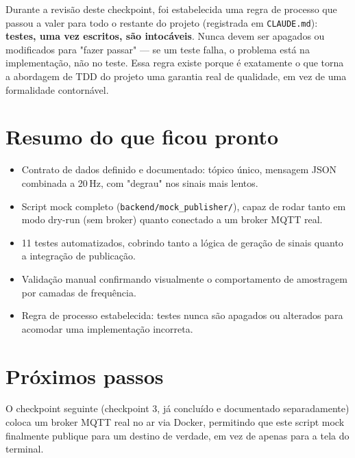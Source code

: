 \documentclass[11pt,a4paper]{article}
\begin{document}
Durante a revisão deste checkpoint, foi estabelecida uma regra de processo que passou a valer para todo o restante do projeto (registrada em \texttt{CLAUDE.md}): \textbf{testes, uma vez escritos, são intocáveis}. Nunca devem ser apagados ou modificados para "fazer passar" --- se um teste falha, o problema está na implementação, não no teste. Essa regra existe porque é exatamente o que torna a abordagem de TDD do projeto uma garantia real de qualidade, em vez de uma formalidade contornável.

\section{Resumo do que ficou pronto}

\begin{itemize}
    \item Contrato de dados definido e documentado: tópico único, mensagem JSON combinada a 20\,Hz, com "degrau" nos sinais mais lentos.
    \item Script mock completo (\texttt{backend/mock\_publisher/}), capaz de rodar tanto em modo dry-run (sem broker) quanto conectado a um broker MQTT real.
    \item 11 testes automatizados, cobrindo tanto a lógica de geração de sinais quanto a integração de publicação.
    \item Validação manual confirmando visualmente o comportamento de amostragem por camadas de frequência.
    \item Regra de processo estabelecida: testes nunca são apagados ou alterados para acomodar uma implementação incorreta.
\end{itemize}

\section{Próximos passos}

O checkpoint seguinte (checkpoint 3, já concluído e documentado separadamente) coloca um broker MQTT real no ar via Docker, permitindo que este script mock finalmente publique para um destino de verdade, em vez de apenas para a tela do terminal.
\end{document}
